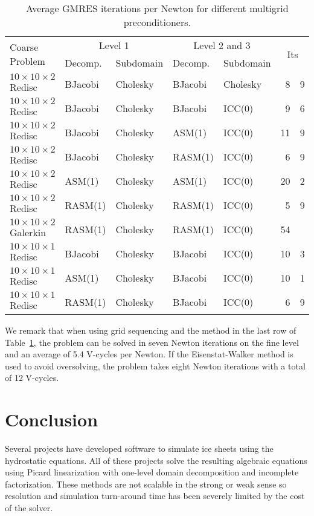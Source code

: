 \documentclass[3p]{elsarticle}
\begin{document}
\begin{table}
  \centering\caption{Average GMRES iterations per Newton for different multigrid preconditioners.}\label{tab:xmg}
  \begin{tabular}{l|ll|ll|r@{.}l}
    \multirow{2}{*}{Coarse Problem} & \multicolumn{2}{c|}{Level 1} & \multicolumn{2}{c|}{Level 2 and 3} & \multicolumn{2}{c}{\multirow{2}{*}{Its}} \\
                                   & Decomp. & Subdomain & Decomp. & Subdomain         \\ \hline
    $10\times 10\times 2$ Redisc   & BJacobi & Cholesky & BJacobi & Cholesky & 8  & 9 \\
    $10\times 10\times 2$ Redisc   & BJacobi & Cholesky & BJacobi & ICC(0)   & 9  & 6 \\
    $10\times 10\times 2$ Redisc   & BJacobi & Cholesky & ASM(1)  & ICC(0)   & 11 & 9 \\
    $10\times 10\times 2$ Redisc   & BJacobi & Cholesky & RASM(1) & ICC(0)   & 6  & 9 \\
    $10\times 10\times 2$ Redisc   & ASM(1)  & Cholesky & ASM(1)  & ICC(0)   & 20 & 2 \\
    $10\times 10\times 2$ Redisc   & RASM(1) & Cholesky & RASM(1) & ICC(0)   & 5  & 9 \\
    $10\times 10\times 2$ Galerkin & RASM(1) & Cholesky & RASM(1) & ICC(0)   & 54 &   \\
    $10\times 10\times 1$ Redisc   & BJacobi & Cholesky & BJacobi & ICC(0)   & 10 & 3 \\
    $10\times 10\times 1$ Redisc   & ASM(1)  & Cholesky & BJacobi & ICC(0)   & 10 & 1 \\
    $10\times 10\times 1$ Redisc   & RASM(1) & Cholesky & BJacobi & ICC(0)   & 6  & 9 \\
  \end{tabular}
\end{table}

We remark that when using grid sequencing and the method in the last row of Table~\ref{tab:xmg}, the problem can be solved in seven Newton iterations on the fine level and an average of 5.4 V-cycles per Newton.
If the Eisenstat-Walker method is used to avoid oversolving, the problem takes eight Newton iterations with a total of 12 V-cycles.

\section{Conclusion}
Several projects \cite{seacism,issm,johnson2007modeling,desmedt2010using,pattyn2003ntd} have developed software to simulate ice sheets using the hydrostatic equations.
All of these projects solve the resulting algebraic equations using Picard linearization with one-level domain decomposition and incomplete factorization.
These methods are not scalable in the strong or weak sense so resolution and simulation turn-around time has been severely limited by the cost of the solver.
\end{document}
